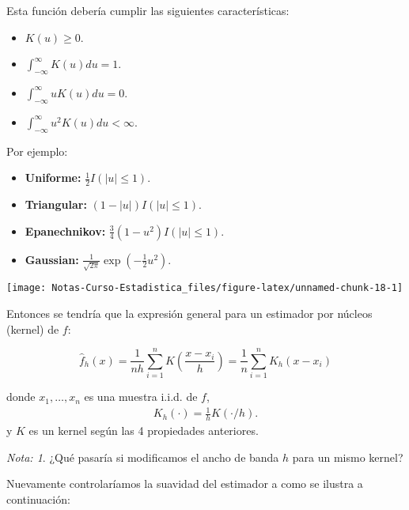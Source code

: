 \documentclass[
  12pt,
]{book}
\providecommand{\tightlist}{%
  \setlength{\itemsep}{0pt}\setlength{\parskip}{0pt}}
\theoremstyle{definition}
\theoremstyle{definition}
\theoremstyle{definition}
\theoremstyle{definition}
\theoremstyle{remark}
\newtheorem*{remark}{Nota: }
\begin{document}
Esta función debería cumplir las siguientes características:

\begin{itemize}
\tightlist
\item
  \(K(u)\geq 0\).
\item
  \(\int_{-\infty}^{\infty} K(u)du = 1\).
\item
  \(\int_{-\infty}^{\infty} u K(u)du = 0\).
\item
  \(\int_{-\infty}^{\infty} u^{2} K(u)du <\infty\).
\end{itemize}

Por ejemplo:

\begin{itemize}
\tightlist
\item
  \textbf{Uniforme:} \(\frac{1}{2} I \left( \left\vert u \right\vert \leq 1 \right)\).
\item
  \textbf{Triangular:} \((1-|u|) I \left( \left\vert u \right\vert \leq 1 \right)\).
\item
  \textbf{Epanechnikov:} \(\frac{3}{4} (1-u^{2}) I \left( \left\vert u \right\vert \leq 1 \right)\).
\item
  \textbf{Gaussian:} \(\frac{1}{\sqrt{2\pi}} \exp \left( -\frac{1}{2}u^{2} \right)\).
\end{itemize}

\begin{center}\texttt{[image: Notas-Curso-Estadistica\_files/figure-latex/unnamed-chunk-18-1]} \end{center}

Entonces se tendría que la expresión general para un estimador por núcleos (kernel) de \(f\):

\begin{equation*}
\hat{f}_{h}\left( x \right) = \frac{1}{nh}\sum_{i=1}^{n} K\left( \frac{x-x_{i}}{h} \right)=\frac{1}{n}\sum_{i=1}^{n} K_h(x-x_{i}) 
\end{equation*}

donde \(x_1,\ldots,x_n\) es una muestra i.i.d. de \(f\),
\begin{align*}
K_h(\cdot)=\frac 1 h K(\cdot /h).
\end{align*}
y \(K\) es un kernel según las 4 propiedades anteriores.

\begin{remark}
¿Qué pasaría si modificamos el ancho de banda \(h\) para un mismo kernel?
\end{remark}

Nuevamente controlaríamos la suavidad del estimador a como se ilustra a continuación:
\end{document}
